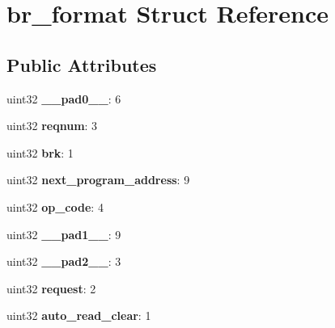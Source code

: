 \hypertarget{structbr__format}{}\section{br\+\_\+format Struct Reference}
\label{structbr__format}
\subsection*{Public Attributes}
\begin{DoxyCompactItemize}
\item 
\mbox{\label{structbr__format_a0ed421979a175cb3ef37b39553ff08bb}} 
uint32 {\bfseries \+\_\+\+\_\+pad0\+\_\+\+\_\+}\+: 6
\item 
\mbox{\label{structbr__format_a5ec7ea2d82858647bf32f7bd915181a7}} 
uint32 {\bfseries reqnum}\+: 3
\item 
\mbox{\label{structbr__format_a475a6b468f320267d0c908977a60660e}} 
uint32 {\bfseries brk}\+: 1
\item 
\mbox{\label{structbr__format_afa660fc729aa444dbcca1ac6e8051100}} 
uint32 {\bfseries next\+\_\+program\+\_\+address}\+: 9
\item 
\mbox{\label{structbr__format_a120d2c58e52db11ff288f42b0a26bd85}} 
uint32 {\bfseries op\+\_\+code}\+: 4
\item 
\mbox{\label{structbr__format_ac7adb620c00ea6ba6393591d24174453}} 
uint32 {\bfseries \+\_\+\+\_\+pad1\+\_\+\+\_\+}\+: 9
\item 
\mbox{\label{structbr__format_ae2bc4d90e9f98bb02bfaa2b080a3008f}} 
uint32 {\bfseries \+\_\+\+\_\+pad2\+\_\+\+\_\+}\+: 3
\item 
\mbox{\label{structbr__format_ae1ffb9e7e41ec4b6b2fbf746b5602a48}} 
uint32 {\bfseries request}\+: 2
\item 
\mbox{\label{structbr__format_a4d9dcfa1c6b26773c5ce93e82bbdab78}} 
uint32 {\bfseries auto\+\_\+read\+\_\+clear}\+: 1
\item 
\mbox{\label{structbr__format_ade794818a5dd46f1f7416b94e6fe28dc}} 

\end{DoxyCompactItemize}

